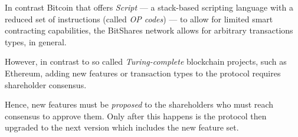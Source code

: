 In contrast Bitcoin that offers \emph{Script} --- a stack-based scripting
language with a reduced set of instructions (called \emph{OP codes}) --- to
allow for limited smart contracting capabilities, the BitShares network allows
for arbitrary transactions types, in general.

However, in contrast to so called \emph{Turing-complete} blockchain projects,
such as Ethereum, adding new features or transaction types to the protocol
requires shareholder consensus.

Hence, new features must be \emph{proposed} to the shareholders who must reach
consensus to approve them. Only after this happens is the protocol then
upgraded to the next version which includes the new feature set.
